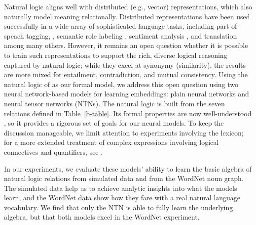 \documentclass[letterpaper]{article}
\begin{document}
Natural logic aligns well with distributed (e.g., vector)
representations, which also naturally model meaning relationally.
Distributed representations have been used successfully in a wide
array of sophisticated language tasks, including part of speach tagging,
\cite{collobert2011natural}, semantic role labeling \cite{collobert2011natural},
sentiment analysis \cite{socher2011semi}, and translation \cite{sutskever2014sequence} 
among many others.
However, it remains an open question whether it is possible to train
such representations to support the rich, diverse logical reasoning
captured by natural logic; while they excel at synonymy (similarity),
the results are more mixed for entailment, contradiction, and mutual
consistency.  Using the natural logic of \cite{maccartney2009extended}
as our formal model, we address this open question using two neural
network-based models for learning embeddings: plain neural networks
and neural tensor networks (NTNs).  The natural logic is built from
the seven relations defined in Table~\ref{b-table}. Its formal
properties are now well-understood \cite{Icard:Moss:2013,Icard:Moss:2013:LILT}, so it
provides a rigorous set of goals for our neural models. To keep the
discussion manageable, we limit attention to experiments involving the
lexicon; for a more extended treatment of complex expressions
involving logical connectives and quantifiers, see
\cite{Bowman:Potts:Manning:2014}. %

In our experiments, we evaluate these models' ability to learn the
basic algebra of natural logic relations from simulated data and from
the WordNet noun graph. The simulated data help us to achieve analytic
insights into what the models learn, and the WordNet data show how they
fare with a real natural language vocabulary.  We find that only the NTN is able to fully
learn the underlying algebra, but that both models excel in the 
WordNet experiment.
\end{document}

